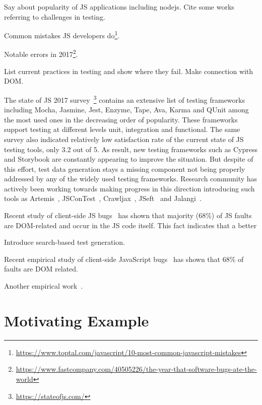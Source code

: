 \documentclass[sigconf]{acmart}
\begin{document}
Say about popularity of JS applications including nodejs. Cite some works referring to challenges in testing.

Common mistakes JS developers do\footnote{\url{https://www.toptal.com/javascript/10-most-common-javascript-mistakes}}.

Notable errors in 2017\footnote{\url{https://www.fastcompany.com/40505226/the-year-that-software-bugs-ate-the-world}}. 

List current practices in testing and show where they fail. Make connection with DOM.

The state of JS 2017 survey~\footnote{\url{https://stateofjs.com/}} contains an extensive list of testing frameworks including Mocha, Jasmine, Jest, Enzyme, Tape, Ava, Karma and QUnit among the most used ones in the decreasing order of popularity. These frameworks support testing at different levels unit, integration and functional. The same survey also indicated relatively low satisfaction rate of the current state of JS testing tools, only 3.2 out of 5. As result, new testing frameworks such as Cypress and Storybook are constantly appearing to improve the situation. But despite of this effort, test data generation stays a missing component not being properly addressed by any of the widely used testing frameworks. Research community has actively been working towards making progress in this direction introducing such tools as Artemis~\cite{artemis2011}, JSConTest~\cite{heidegger2010contract}, Crawljax~\cite{mesbah2012crawling}, JSeft~\cite{mirshokraie2015jseft} and Jalangi~\cite{sen2013jalangi}. 

Recent study of client-side JS bugs~\cite{ocariza2017study} has shown that majority (68\%) of JS faults are DOM-related and occur in the JS code itself. This fact indicates that a better  

Introduce search-based test generation.



Recent empirical study of client-side JavaScript bugs~\cite{frolin:TSE16} has shown that 68\% of faults are DOM related.

Another empirical work~\cite{richards2010analysis}.

\section{Motivating Example}
\label{sec.example}
\end{document}
